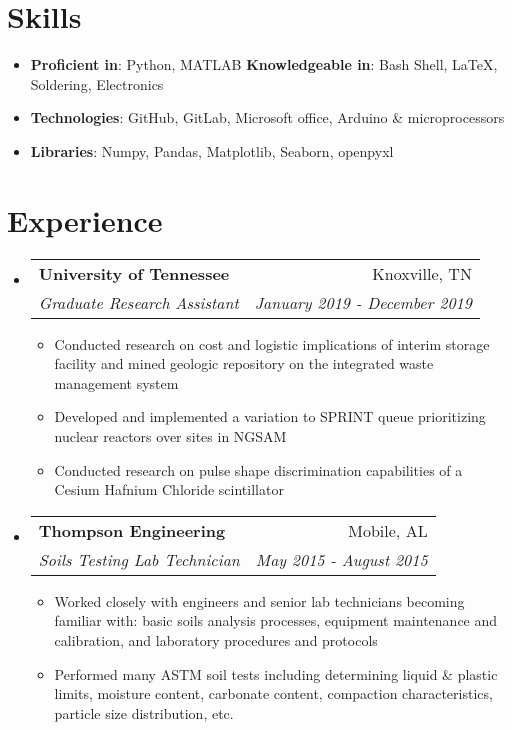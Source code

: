 \documentclass[letterpaper,10pt]{article}
\makeatletter
\newcommand{\resumeSubheading}[4]{
  \vspace{-1pt}\item[]
  \begin{tabular*}{0.98\textwidth}{l@{\extracolsep{\fill}}r}
      \hspace{-10pt}\textbf{#1} & #2 \\
      \hspace{-10pt}\textit{\small#3} & \textit{\small #4} \\
    \end{tabular*}\vspace{-5pt}
}
\newcommand{\resumeSubHeadingListStart}{\begin{itemize}[leftmargin=*]}
\newcommand{\resumeSubHeadingListEnd}{\end{itemize}}
\newcommand{\resumeItemListStart}{\begin{itemize}}
\newcommand{\resumeItemListEnd}{\end{itemize}\vspace{-5pt}}
\newcommand{\shorterSection}[1]{\vspace{-10pt}\section{#1}}
\makeatother
\begin{document}
\shorterSection{Skills}
  \resumeSubHeadingListStart
  \small
    \item{
     \textbf{Proficient in}{: Python, MATLAB}
     \hfill
     \textbf{Knowledgeable in}{: Bash Shell, LaTeX, Soldering, Electronics}
    }
    \vspace{-5pt}
    \item{
    \textbf{Technologies}{: GitHub, GitLab, Microsoft office, Arduino}
    \hfill
    \& microprocessors
    }
    \vspace{-5pt}
    \item{
     \textbf{Libraries}{: Numpy, Pandas, Matplotlib, Seaborn, openpyxl}
    }
\resumeSubHeadingListEnd

\shorterSection{Experience}
  \resumeSubHeadingListStart
    \resumeSubheading
      {University of Tennessee}{Knoxville, TN}
      {Graduate Research Assistant}{January 2019 - December 2019}
      \resumeItemListStart
        \small
        \item{
            Conducted research on cost and logistic implications of interim storage facility and mined geologic repository on the integrated waste management system
        }
        \item{ 
            Developed and implemented a variation to SPRINT queue prioritizing nuclear reactors over sites in NGSAM
        }
        \item{
            Conducted research on pulse shape discrimination capabilities of a Cesium Hafnium Chloride scintillator
        }
      \resumeItemListEnd
    \resumeSubheading
      {Thompson Engineering}{Mobile, AL}
      {Soils Testing Lab Technician}{May 2015 - August 2015}
      \resumeItemListStart
        \small
        \item{
            Worked closely with engineers and senior lab technicians becoming familiar with: basic soils analysis processes, equipment maintenance and calibration, and laboratory procedures and protocols
        }
        \item{
            Performed many ASTM soil tests including determining liquid \& plastic limits, moisture content, carbonate content, compaction characteristics, particle size distribution, etc.
        }
      \resumeItemListEnd

  \resumeSubHeadingListEnd
\end{document}
